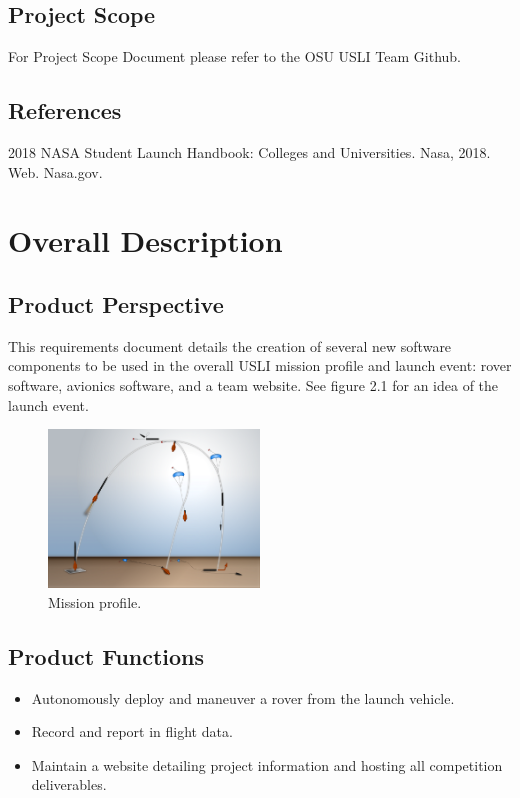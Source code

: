 \documentclass{scrreprt}
\begin{document}
\section{Project Scope}
For Project Scope Document please refer to the OSU USLI Team Github.

\section{References}
2018 NASA Student Launch Handbook: Colleges and Universities. Nasa, 2018. Web. Nasa.gov.

\chapter{Overall Description}

\section{Product Perspective}
This requirements document details the creation of several new software components to be used in the overall USLI mission profile and launch event: rover software, avionics software, and a team website. See figure 2.1 for an idea of the launch event.

\begin{figure}
  \caption{Mission profile.}
  \centering
    \includegraphics[width=0.5\textwidth]{mission-profile}
\end{figure}


\section{Product Functions}
\begin{itemize} 
\item Autonomously deploy and maneuver a rover from the launch vehicle. 
\item Record and report in flight data.
\item Maintain a website detailing project information and hosting all competition deliverables.
\end{itemize}
\end{document}
